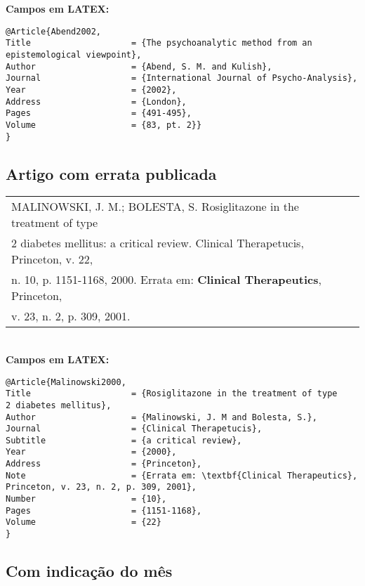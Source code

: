 \textbf{Campos em LATEX:} 
	
\begingroup
\fontsize{10pt}{12pt}\selectfont
\begin{verbatim}
@Article{Abend2002,
Title                    = {The psychoanalytic method from an 
epistemological viewpoint},
Author                   = {Abend, S. M. and Kulish},
Journal                  = {International Journal of Psycho-Analysis},
Year                     = {2002},
Address                  = {London},
Pages                    = {491-495},
Volume                   = {83, pt. 2}}
}
\end{verbatim}
\endgroup
\subsection{Artigo com errata publicada}
	
\begin{tabular}{|l|c|} \hline
	MALINOWSKI, J. M.; BOLESTA, S. Rosiglitazone in the treatment of 
	type                                                             \\2 diabetes mellitus: a critical review. Clinical Therapetucis,
	Princeton, v. 22,                                                \\n. 10, p. 1151-1168, 2000. Errata em: \textbf{Clinical
	Therapeutics}, Princeton,                                        \\v. 23, n. 2, p. 309, 2001.
	                                                                 \\\hline
\end{tabular} \\
	
\textbf{Campos em LATEX:} 
	
\begingroup
\fontsize{10pt}{12pt}\selectfont
\begin{verbatim}
@Article{Malinowski2000,
Title                    = {Rosiglitazone in the treatment of type 
2 diabetes mellitus},
Author                   = {Malinowski, J. M and Bolesta, S.},
Journal                  = {Clinical Therapetucis},
Subtitle                 = {a critical review},
Year                     = {2000},
Address                  = {Princeton},
Note                     = {Errata em: \textbf{Clinical Therapeutics}, 
Princeton, v. 23, n. 2, p. 309, 2001},
Number                   = {10},
Pages                    = {1151-1168},
Volume                   = {22}
}
\end{verbatim}
\endgroup
\subsection{Com indicação do mês}
	
